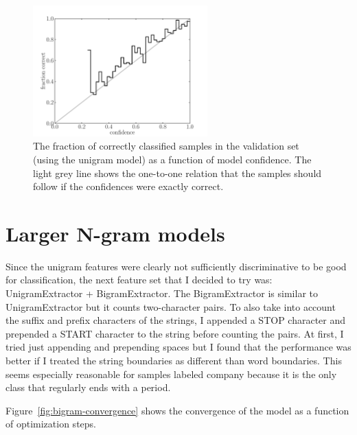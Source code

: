 \documentclass[11pt]{article}
\newcommand{\Fig}[1]{Figure~\ref{fig:#1}}
\newcommand{\figlabel}[1]{\label{fig:#1}}
\newcommand{\code}[1]{{\sffamily #1}}
\begin{document}
\begin{figure}[htbp]
\begin{center}
    \includegraphics[width=0.6\textwidth]{unigram_confidence_scale.pdf}
\end{center}
\caption{%
The fraction of correctly classified samples in the validation set (using the
unigram model) as a function of model confidence.
The light grey line shows the one-to-one relation that the samples should
follow if the confidences were exactly correct.
\figlabel{unigram-confidence-scale}}
\end{figure}

\clearpage

\section{Larger N-gram models}

Since the unigram features were clearly not sufficiently discriminative to be
good for classification, the next feature set that I decided to try was:
\code{UnigramExtractor + BigramExtractor}.
The \code{BigramExtractor} is similar to \code{UnigramExtractor} but it counts
two-character pairs.
To also take into account the suffix and prefix characters of the strings, I
appended a \code{STOP} character and prepended a \code{START} character to the
string before counting the pairs.
At first, I tried just appending and prepending spaces but I found that the
performance was better if I treated the string boundaries as different than
word boundaries.
This seems especially reasonable for samples labeled \code{company} because
it is the only class that regularly ends with a period.

\Fig{bigram-convergence} shows the convergence of the model as a function of
optimization steps.
\end{document}
